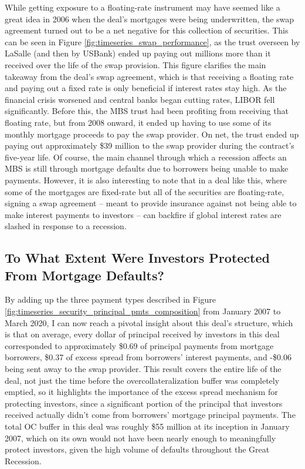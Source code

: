 \documentclass[12pt]{article}
\begin{document}
While getting exposure to a floating-rate instrument may have seemed like a great idea in 2006 when the deal’s mortgages were being underwritten, the swap agreement turned out to be a net negative for this collection of securities. This can be seen in Figure \ref{fig:timeseries_swap_performance}, as the trust overseen by LaSalle (and then by USBank) ended up paying out millions more than it received over the life of the swap provision. This figure clarifies the main takeaway from the deal's swap agreement, which is that receiving a floating rate and paying out a fixed rate is only beneficial if interest rates stay high. As the financial crisis worsened and central banks began cutting rates, LIBOR fell significantly. Before this, the MBS trust had been profiting from receiving that floating rate, but from 2008 onward, it ended up having to use some of its monthly mortgage proceeds to pay the swap provider. On net, the trust ended up paying out approximately \$39 million to the swap provider during the contract's five-year life. Of course, the main channel through which a recession affects an MBS is still through mortgage defaults due to borrowers being unable to make payments. However, it is also interesting to note that in a deal like this, where some of the mortgages are fixed-rate but all of the securities are floating-rate, signing a swap agreement -- meant to provide insurance against not being able to make interest payments to investors -- can backfire if global interest rates are slashed in response to a recession.

\subsection*{To What Extent Were Investors Protected From Mortgage Defaults?}

By adding up the three payment types described in Figure \ref{fig:timeseries_security_principal_pmts_composition} from January 2007 to March 2020, I can now reach a pivotal insight about this deal’s structure, which is that on average, every dollar of principal received by investors in this deal corresponded to approximately \$0.69 of principal payments from mortgage borrowers, \$0.37 of excess spread from borrowers’ interest payments, and -\$0.06 being sent away to the swap provider. This result covers the entire life of the deal, not just the time before the overcollateralization buffer was completely emptied, so it highlights the importance of the excess spread mechanism for protecting investors, since a significant portion of the principal that investors received actually didn’t come from borrowers’ mortgage principal payments. The total OC buffer in this deal was roughly \$55 million at its inception in January 2007, which on its own would not have been nearly enough to meaningfully protect investors, given the high volume of defaults throughout the Great Recession.
\end{document}
